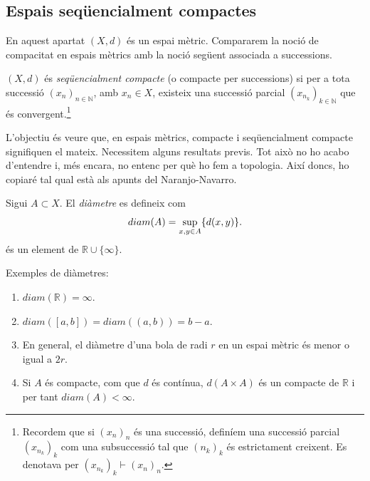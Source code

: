 \documentclass[../main.tex]{subfiles}
\begin{document}
\subsection{Espais seqüencialment compactes}

En aquest apartat $(X,d)$ és un espai mètric. Compararem la noció de compacitat en espais mètrics amb la noció següent associada a successions.

\begin{defi}
\label{def:espaisequencialmentcompactes} $(X,d)$ és \textit{seqüencialment compacte} (o compacte per successions) si per a tota successió $(x_n)_{n\in\mathbb{N}}$, amb $x_n\in X$, existeix una successió parcial $(x_{n_k})_{k\in\mathbb{N}}$ que és convergent.\footnote{Recordem que si $(x_n)_n$ és una successió, definíem una successió parcial $(x_{n_k})_k$ com una subsuccessió tal que $(n_k)_k$ és estrictament creixent. Es denotava per $(x_{n_k})_k\vdash (x_n)_n$.}
\end{defi}

L'objectiu és veure que, en espais mètrics, compacte i seqüencialment compacte signifiquen el mateix. Necessitem alguns resultats previs. Tot això no ho acabo d'entendre i, més encara, no entenc per què ho fem a topologia. Així doncs, ho copiaré tal qual està als apunts del Naranjo-Navarro.

\begin{defi}
[Diàmetre]\label{def:diametre} Sigui $A\subset X$. El \textit{diàmetre} es defineix com 
\begin{equation}
    \notag
    diam(A) = \sup_{x,y\in A}\{d(x,y)\}. 
\end{equation}
és un element de $\mathbb{R}\cup\{\infty\}$.
\end{defi}
\begin{ej}
\label{ej:diametre} Exemples de diàmetres:
\begin{enumerate}[(1)]
    \item $diam(\mathbb{R}) = \infty$.
    \item $diam([a,b]) = diam((a,b)) = b-a$.
    \item En general, el diàmetre d'una bola de radi $r$ en un espai mètric és menor o igual a $2r$.
    \item Si $A$ és compacte, com que $d$ és contínua, $d(A\times A)$ és un compacte de $\mathbb{R}$ i per tant $diam(A)<\infty$.
\end{enumerate}
\end{ej}
\end{document}
